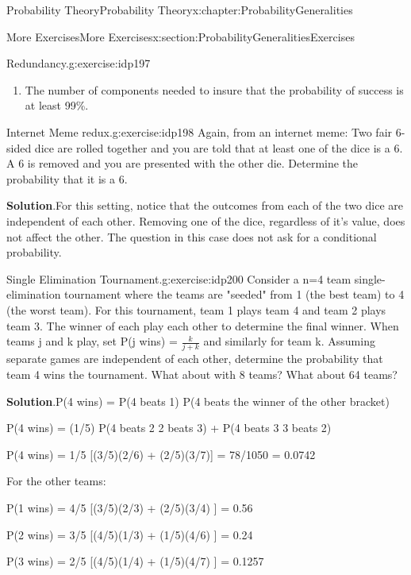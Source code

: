 \documentclass[oneside,10pt,]{book}
\newcommand{\blocktitlefont}{\relax}
\numberwithin{equation}{section}
\begin{document}
\begin{chapterptx}{Probability Theory}{}{Probability Theory}{}{}{x:chapter:ProbabilityGeneralities}
\begin{sectionptx}{More Exercises}{}{More Exercises}{}{}{x:section:ProbabilityGeneralitiesExercises}
\begin{inlineexercise}{Redundancy.}{g:exercise:idp197}
\begin{enumerate}
\item{}The number of components needed to insure that the probability of success is at least 99\%.%
\end{enumerate}
%
\end{inlineexercise}%
\begin{inlineexercise}{Internet Meme redux.}{g:exercise:idp198}%
Again, from an internet meme:  Two fair 6-sided dice are rolled together and you are told that at least one of the dice is a 6. A 6 is removed and you are presented with the other die.  Determine the probability that it is a 6.%
\par\smallskip%
\noindent\textbf{\blocktitlefont Solution}.\hypertarget{g:solution:idp199}{}\quad{}For this setting, notice that the outcomes from each of the two dice are independent of each other. Removing one of the dice, regardless of it's value, does not affect the other. The question in this case does not ask for a conditional probability.%
\end{inlineexercise}%
\begin{inlineexercise}{Single Elimination Tournament.}{g:exercise:idp200}%
Consider a n=4 team single-elimination tournament where the teams are "seeded" from 1 (the best team) to 4 (the worst team).  For this tournament, team 1 plays team 4 and team 2 plays team 3. The winner of each play each other to determine the final winner. When teams j and k play, set P(j wins) = \(\frac{k}{j+k}\) and similarly for team k.  Assuming separate games are independent of each other, determine the probability that team 4 wins the tournament. What about with 8 teams? What about 64 teams?%
\par\smallskip%
\noindent\textbf{\blocktitlefont Solution}.\hypertarget{g:solution:idp201}{}\quad{}P(4 wins) = P(4 beats 1) P(4 beats the winner of the other bracket)%
\par
P(4 wins) = (1\slash{}5) \textasteriskcentered{} P(4 beats 2 \textbar{} 2 beats 3) + P(4 beats 3 \textbar{} 3 beats 2)%
\par
P(4 wins) = 1\slash{}5 [(3\slash{}5)(2\slash{}6) + (2\slash{}5)(3\slash{}7)] = 78\slash{}1050 = 0.0742%
\par
For the other teams:%
\par
P(1 wins) = 4\slash{}5 [(3\slash{}5)(2\slash{}3) + (2\slash{}5)(3\slash{}4) ] = 0.56%
\par
P(2 wins) = 3\slash{}5 [(4\slash{}5)(1\slash{}3) + (1\slash{}5)(4\slash{}6) ] = 0.24%
\par
P(3 wins) = 2\slash{}5 [(4\slash{}5)(1\slash{}4) + (1\slash{}5)(4\slash{}7) ] = 0.1257%
\end{inlineexercise}%
\end{sectionptx}
\end{chapterptx}
\end{document}
